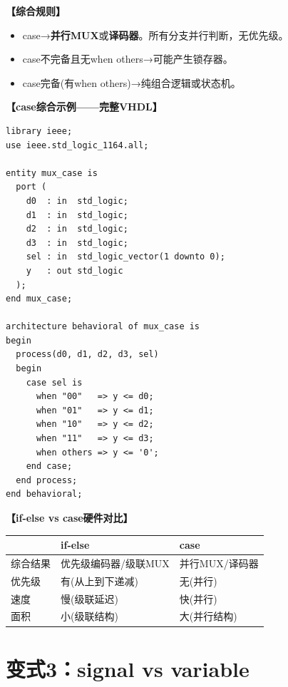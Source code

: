 \begin{detailbox}[完整教学]
\textbf{【综合规则】}
\begin{itemize}
  \item case→\textbf{并行MUX}或\textbf{译码器}。所有分支并行判断，无优先级。
  \item case不完备且无when others→可能产生锁存器。
  \item case完备(有when others)→纯组合逻辑或状态机。
\end{itemize}

\textbf{【case综合示例——完整VHDL】}
\begin{lstlisting}[caption={case综合为并行MUX}]
library ieee;
use ieee.std_logic_1164.all;

entity mux_case is
  port (
    d0  : in  std_logic;
    d1  : in  std_logic;
    d2  : in  std_logic;
    d3  : in  std_logic;
    sel : in  std_logic_vector(1 downto 0);
    y   : out std_logic
  );
end mux_case;

architecture behavioral of mux_case is
begin
  process(d0, d1, d2, d3, sel)
  begin
    case sel is
      when "00"   => y <= d0;
      when "01"   => y <= d1;
      when "10"   => y <= d2;
      when "11"   => y <= d3;
      when others => y <= '0';
    end case;
  end process;
end behavioral;
\end{lstlisting}

\textbf{【if-else vs case硬件对比】}
\begin{center}
\begin{tabular}{|l|l|l|}
\hline & if-else & case \\
\hline
综合结果 & 优先级编码器/级联MUX & 并行MUX/译码器 \\
优先级 & 有(从上到下递减) & 无(并行) \\
速度 & 慢(级联延迟) & 快(并行) \\
面积 & 小(级联结构) & 大(并行结构) \\
\hline
\end{tabular}
\end{center}
\end{detailbox}


\section{变式3：signal vs variable}

